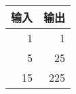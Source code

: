 \begin{tabular}{|r|r|}
  \hline
  \multicolumn{1}{|c|}{输入} &
  \multicolumn{1}{c|}{输出} \\ \hline
  1 & 1 \\ 5 & 25 \\ 15 & 225 \\ \hline
\end{tabular}
